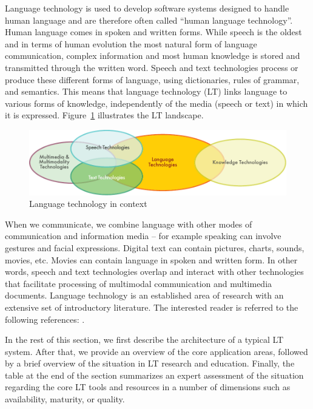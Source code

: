 \begin{multicols}{2}
Language technology is used to develop software systems designed to handle human language and are therefore often called “human language technology”. Human language comes in spoken and written forms. While speech is the oldest and in terms of human evolution the most natural form of language communication, complex information and most human knowledge is stored and transmitted through the written word. Speech and text technologies process or produce these different forms of language, using dictionaries, rules of grammar, and semantics. This means that language technology (LT) links language to various forms of knowledge, independently of the media (speech or text) in which it is expressed. Figure~\ref{fig:ltincontext_en} illustrates the LT landscape.

\begin{figure}[htb]
  \center
  \includegraphics[width=\textwidth]{../_media/english/language_technologies}
  \caption{Language technology in context}
  \label{fig:ltincontext_en}
\end{figure}

 When we communicate, we combine language with other modes of communication and information media – for example speaking can involve gestures and facial expressions. Digital text can contain pictures, charts, sounds, movies, etc. Movies can contain language in spoken and written form. In other words, speech and text technologies overlap and interact with other technologies that facilitate processing of multimodal communication and multimedia documents.
 Language technology is an established area of research with an extensive set of introductory literature. The interested reader is referred to the following references: \cite{carstensen-etal1, jurafsky-martin01, manning-schuetze1, lt-world1, lt-survey1}.

In the rest of this section, we first describe the architecture of a typical LT system. After that, we provide an overview of the core application areas, followed by a brief overview of the situation in LT research and education. Finally, the table at the end of the section summarizes an expert assessment of the situation regarding the core LT tools and resources in a number of dimensions such as availability, maturity, or quality.


\end{multicols}

